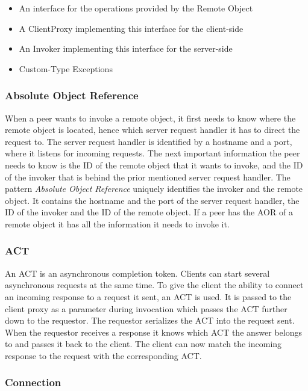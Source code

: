 \begin{itemize}\itemsep0pt
\item An interface for the operations provided by the Remote Object
\item A ClientProxy implementing this interface for the client-side
\item An Invoker implementing this interface for the server-side
\item Custom-Type Exceptions
\end{itemize}

\subsubsection{Absolute Object Reference}
When a peer wants to invoke a remote object, it first needs to know where the remote object is located, hence which server request handler it has to direct the request to. The server request handler is identified by a hostname and a port, where it listens for incoming requests. The next important information the peer needs to know is the ID of the remote object that it wants to invoke, and the ID of the invoker that is behind the prior mentioned server request handler. The pattern \textit{Absolute Object Reference} uniquely identifies the invoker and the remote object. It contains the hostname and the port of the server request handler, the ID of the invoker and the ID of the remote object. If a peer has the AOR of a remote object it has all the information it needs to invoke it. 

\subsubsection{ACT}
An ACT is an asynchronous completion token. Clients can start several asynchronous requests at the same time. To give the client the ability to connect an incoming response to a request it sent, an ACT is used. It is passed to the client proxy as a parameter during invocation which passes the ACT further down to the requestor. The requestor serializes the ACT into the request sent. When the requestor receives a response it knows which ACT the answer belongs to and passes it back to the client. The client can now match the incoming response to the request with the corresponding ACT. 

\subsubsection{Connection}

